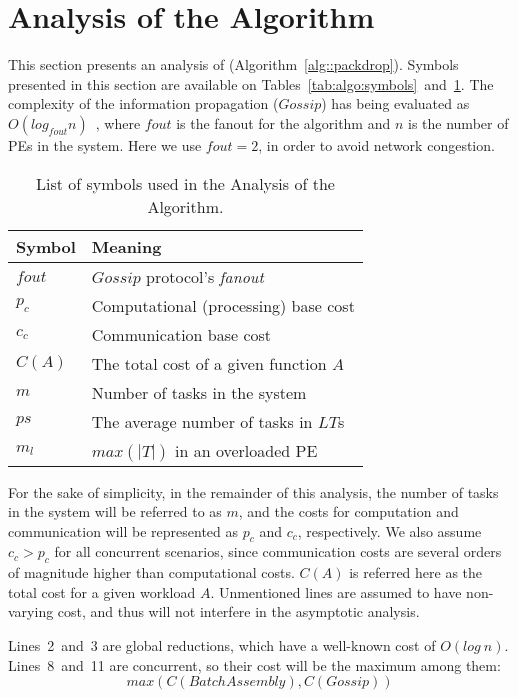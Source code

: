 \section{Analysis of the Algorithm} \label{sec:analysis}

This section presents an analysis of \packdrop (Algorithm~\ref{alg::packdrop}). 
Symbols presented in this section are available on Tables~\ref{tab:algo:symbols}~and~\ref{tab:analysis:symbols}.
The complexity of the information propagation ($Gossip$) has being evaluated as $O(log_{fout}n)$~\cite{grapevine},
where $fout$ is the fanout for the algorithm and $n$ is the number of PEs in the system.
Here we use $fout=2$, in order to avoid network congestion. 

\begin{table}[b]
	\caption{List of symbols used in the Analysis of the Algorithm.}
	\centering	
	\begin{tabular}{l l}
		\toprule
		\textbf{Symbol}		& \textbf{Meaning} \\
		\midrule
		$fout$			& $Gossip$ protocol's \textit{fanout} \\ 
		$p_c$			& Computational (processing) base cost \\
		$c_c$			& Communication base cost \\
		$C(A)$			& The total cost of a given function $A$ \\
		$m$				& Number of tasks in the system \\
		$ps$				& The average number of tasks in $LT$s \\
		$m_l$			& $max(|T|)$ in an overloaded PE \\
		\bottomrule
	\end{tabular}
	\label{tab:analysis:symbols}
\end{table}

For the sake of simplicity, in the remainder of this analysis, the number of tasks in the system
will be referred to as $m$, and the costs for computation and communication will be represented as $p_c$ and $c_c$, respectively.
We also assume $c_c > p_c$ for all concurrent scenarios, since communication costs are several orders of magnitude higher than computational costs.
$C(A)$ is referred here as the total cost for a given workload $A$.
Unmentioned lines are assumed to have non-varying cost, and thus will not interfere in the asymptotic analysis.

Lines~2~and~3 are global reductions, which have a well-known cost of $O(log\ n)$.
Lines~8~and~11 are concurrent, so their cost will be the maximum among them:
\begin{equation}
  max(C(BatchAssembly),C(Gossip))
\end{equation}

